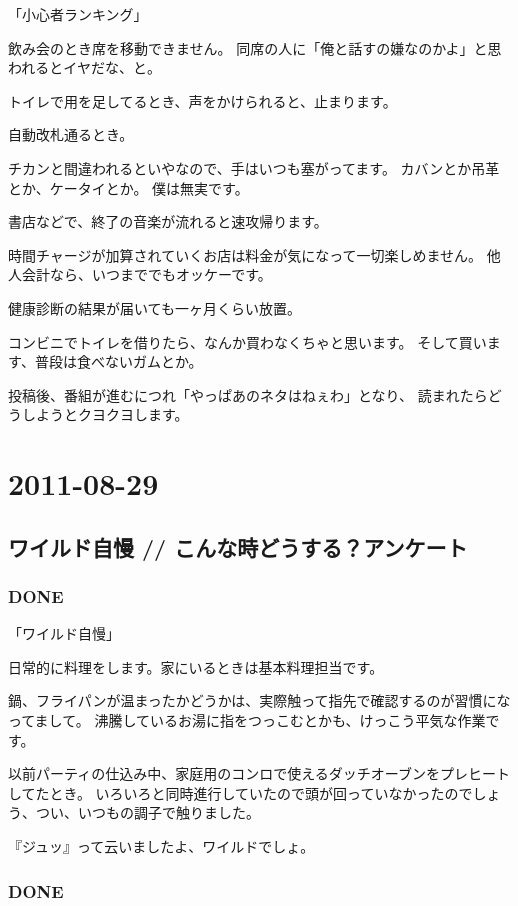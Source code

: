 \documentclass[11pt]{article}
\begin{document}
「小心者ランキング」

飲み会のとき席を移動できません。
同席の人に「俺と話すの嫌なのかよ」と思われるとイヤだな、と。

トイレで用を足してるとき、声をかけられると、止まります。

自動改札通るとき。

チカンと間違われるといやなので、手はいつも塞がってます。
カバンとか吊革とか、ケータイとか。
僕は無実です。

書店などで、終了の音楽が流れると速攻帰ります。

時間チャージが加算されていくお店は料金が気になって一切楽しめません。
他人会計なら、いつまででもオッケーです。

健康診断の結果が届いても一ヶ月くらい放置。

コンビニでトイレを借りたら、なんか買わなくちゃと思います。
そして買います、普段は食べないガムとか。

投稿後、番組が進むにつれ「やっぱあのネタはねぇわ」となり、
読まれたらどうしようとクヨクヨします。
\section{2011-08-29}
\label{sec-77}
\subsection{ワイルド自慢 // こんな時どうする？アンケート}
\label{sec-77_1}
\subsubsection{\textbf{DONE}}
\label{sec-77_1_1}

「ワイルド自慢」

日常的に料理をします。家にいるときは基本料理担当です。

鍋、フライパンが温まったかどうかは、実際触って指先で確認するのが習慣になってまして。
沸騰しているお湯に指をつっこむとかも、けっこう平気な作業です。

以前パーティの仕込み中、家庭用のコンロで使えるダッチオーブンをプレヒートしてたとき。
いろいろと同時進行していたので頭が回っていなかったのでしょう、つい、いつもの調子で触りました。

『ジュッ』って云いましたよ、ワイルドでしょ。
\subsubsection{\textbf{DONE}}
\label{sec-77_1_2}
\end{document}

